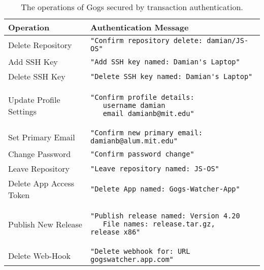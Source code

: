 \begin{table}[h]
\centering

\begin{tabular}{ m{5cm} m{9cm}  } 
 \hline
 Operation & Authentication Message \\ 
 \hline \hline

 Delete Repository & \lstinline|"Confirm repository delete: damian/JS-OS"| \\ \hline

 Add SSH Key & \lstinline|"Add SSH key named: Damian's Laptop"| \\ \hline

 Delete SSH Key & \lstinline|"Delete SSH key named: Damian's Laptop"| \\ \hline

 Update Profile Settings & 
 \begin{lstlisting} 
"Confirm profile details:
   username damian
   email damianb@mit.edu"
\end{lstlisting} 
\\ \hline

 Set Primary Email & \lstinline|"Confirm new primary email: damianb@alum.mit.edu"| \\ \hline

 Change Password & \lstinline|"Confirm password change"| \\ \hline

 Leave Repository & \lstinline|"Leave repository named: JS-OS"| \\ \hline

 Delete App Access Token & \lstinline|"Delete App named: Gogs-Watcher-App"| \\ \hline

 Publish New Release &
 \begin{lstlisting} 
"Publish release named: Version 4.20
   File names: release.tar.gz, release_x86"
\end{lstlisting} 
\\ \hline

  Delete Web-Hook & \lstinline|"Delete webhook for: URL gogswatcher.app.com"| \\ \hline

\end{tabular}
\caption{The operations of Gogs secured by transaction authentication.}
\label{Table:GogsSecuredRoutes}
\end{table}

